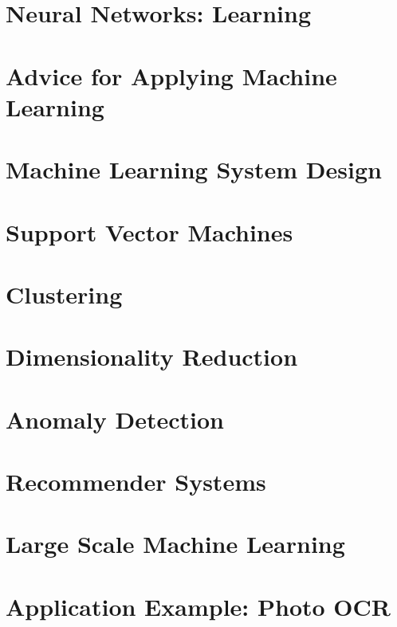 \documentclass[english, 11pt]{article}
\begin{document}
\section{Neural Networks: Learning}


\section{Advice for Applying Machine Learning}


\section{Machine Learning System Design}


\section{Support Vector Machines}


\section{Clustering}


\section{Dimensionality Reduction}


\section{Anomaly Detection}


\section{Recommender Systems}


\section{Large Scale Machine Learning}


\section{Application Example: Photo OCR}

\end{document}
